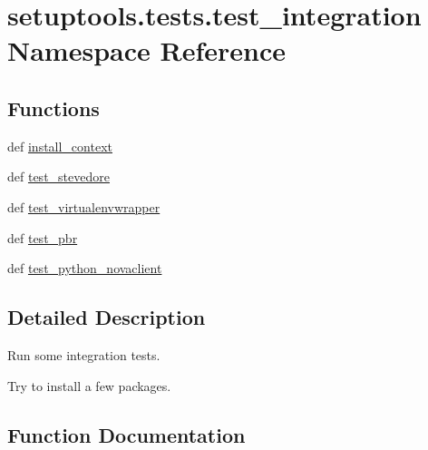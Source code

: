 \hypertarget{namespacesetuptools_1_1tests_1_1test__integration}{}\section{setuptools.\+tests.\+test\+\_\+integration Namespace Reference}
\label{namespacesetuptools_1_1tests_1_1test__integration}
\subsection*{Functions}
\begin{DoxyCompactItemize}
\item 
def \hyperlink{namespacesetuptools_1_1tests_1_1test__integration_abf2e404fb0356a5070200f2c7b19ecaf}{install\+\_\+context}
\item 
def \hyperlink{namespacesetuptools_1_1tests_1_1test__integration_abbfe926191a031dc4448235c3a844393}{test\+\_\+stevedore}
\item 
def \hyperlink{namespacesetuptools_1_1tests_1_1test__integration_a4e88e04ef9d6b7b6e0928b0b766432b1}{test\+\_\+virtualenvwrapper}
\item 
def \hyperlink{namespacesetuptools_1_1tests_1_1test__integration_ac0bc0725c755ca4c1badf64bf31acd2c}{test\+\_\+pbr}
\item 
def \hyperlink{namespacesetuptools_1_1tests_1_1test__integration_ac32f4405b7abfcc71dfd65dc749a2f77}{test\+\_\+python\+\_\+novaclient}
\end{DoxyCompactItemize}


\subsection{Detailed Description}
\begin{DoxyVerb}Run some integration tests.

Try to install a few packages.
\end{DoxyVerb}
 

\subsection{Function Documentation}
\hypertarget{namespacesetuptools_1_1tests_1_1test__integration_abf2e404fb0356a5070200f2c7b19ecaf}{}
